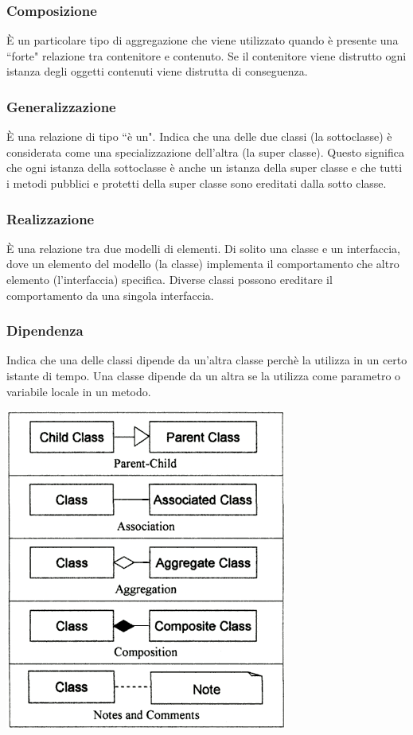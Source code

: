 \documentclass{article}
\begin{document}
\subsubsection{Composizione}
\`E un particolare tipo di aggregazione che viene utilizzato quando \`e presente una ``forte" relazione tra contenitore e contenuto. Se il contenitore viene distrutto ogni istanza degli oggetti contenuti viene distrutta di conseguenza.

\subsubsection{Generalizzazione}
\`E una relazione di tipo ``\`e un". Indica che una delle due classi (la sottoclasse) \`e considerata come una specializzazione dell'altra (la super classe). Questo significa che ogni istanza della sottoclasse \`e anche un istanza della super classe e che tutti i metodi pubblici e protetti della super classe sono ereditati dalla sotto classe. 

\subsubsection{Realizzazione}
\`E una relazione tra due modelli di elementi. Di solito una classe e un interfaccia, dove un elemento del modello (la classe) implementa il comportamento che altro elemento (l'interfaccia) specifica. Diverse classi possono ereditare il comportamento da una singola interfaccia.

\subsubsection{Dipendenza}
Indica che una delle classi dipende da un'altra classe perch\`e la utilizza in un certo istante di tempo. Una classe dipende da un altra se la utilizza come parametro o variabile locale in un metodo. 
\vspace{0.5cm}
\begin{center}
\includegraphics[scale=0.37]{class-not.png}\\
\end{center}
\end{document}
